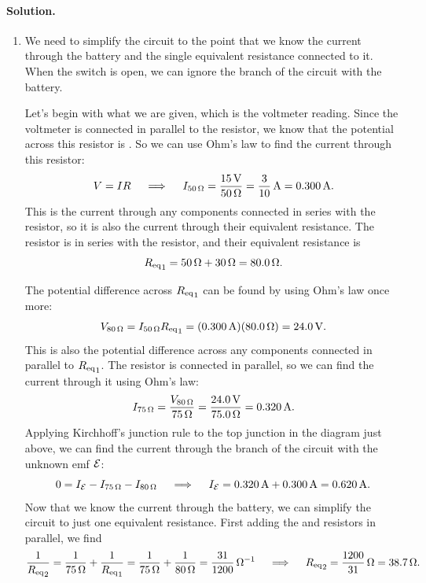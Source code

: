 \documentclass[11pt]{article}
\newcommand{\beq}{\begin{equation*}}
\newcommand{\eeq}{\end{equation*}}
\newenvironment{solution}
{
    \paragraph{Solution.}
    \ignorespaces
}
{
    \bigskip
}
\begin{document}
\begin{solution}
	\begin{enumerate}
		\item We need to simplify the circuit to the point that we know the current through the battery and the single equivalent resistance connected to it.  When the switch is open, we can ignore the branch of the circuit with the  battery.
		
		\vspace{1.5in}
		
		Let's begin with what we are given, which is the voltmeter reading.  Since the voltmeter is connected in parallel to the  resistor, we know that the potential across this resistor is .  So we can use Ohm's law to find the current through this resistor:
		\beq
			V = I R
			\qimplies
			I_{\Sohm{50}} = \frac{\Svolt{15}}{\Sohm{50}}
			= \frac{3}{10}\,\si{\ampere}
			= \Samp{0.300}.
		\eeq
		This is the current through any components connected in series with the  resistor, so it is also the current through their equivalent resistance.  The  resistor is in series with the  resistor, and their equivalent resistance is
		\beq
			{\Req}_1 = \Sohm{50} + \Sohm{30}
			= \Sohm{80.0}.
		\eeq
		
		\vspace{1.5in}
		
		The potential difference across ${R_\text{eq}}_1$ can be found by using Ohm's law once more:
		\beq
			V_{\Sohm{80}} = I_{\Sohm{50}} {\Req}_1 = (\Samp{0.300}) (\Sohm{80.0}) = \Svolt{24.0}.
		\eeq
		This is also the potential difference across any components connected in parallel to ${R_\text{eq}}_1$.  The  resistor is connected in parallel, so we can find the current through it using Ohm's law:
		\beq
			I_{\Sohm{75}} = \frac{V_{\Sohm{80}}}{\Sohm{75}}
			= \frac{\Svolt{24.0}}{\Sohm{75.0}}
			= \Samp{0.320}.
		\eeq
		Applying Kirchhoff's junction rule to the top junction in the diagram just above, we can find the current through the branch of the circuit with the unknown emf $\mathcal{E}$:
		\beq
			0 = I_\cE - I_{\Sohm{75}} - I_{\Sohm{80}}
			\qimplies
			I_\cE = \Samp{0.320} + \Samp{0.300}
			= \Samp{0.620}.
		\eeq
		Now that we know the current through the battery, we can simplify the circuit to just one equivalent resistance.  First adding the  and  resistors in parallel, we find
		\beq
			\frac{1}{{\Req}_2} = \frac{1}{\Sohm{75}} + \frac{1}{{\Req}_1}
			= \frac{1}{\Sohm{75}} + \frac{1}{\Sohm{80}}
			= \frac{31}{1200}\,\si{\per\ohm}
			\qimplies
			{\Req}_2 = \frac{1200}{31}\,\si{\ohm}
			= \Sohm{38.7}.
		\eeq
		

\end{enumerate}
\end{solution}
\end{document}
